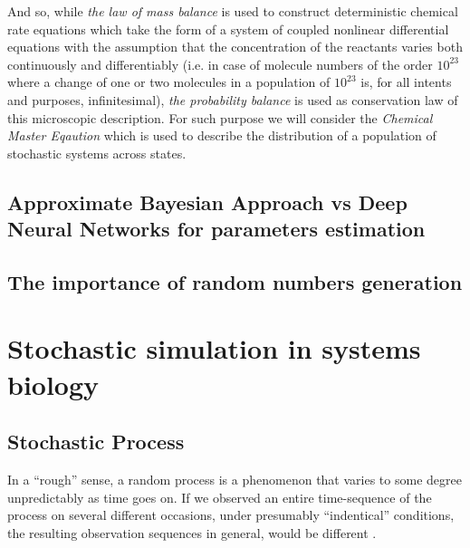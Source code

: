 \documentclass[12pt,a4paper]{report}
\begin{document}
And so, while \emph{the law of mass balance} is used to construct deterministic chemical rate equations which take the form of a system of coupled nonlinear differential equations with the assumption that the concentration of the reactants varies both continuously and differentiably (i.e. in case of molecule numbers of the order $10^{23}$ where a change of one or two molecules in a population of $10^{23}$ is, for all intents and purposes, infinitesimal), \emph{the probability balance} is used as conservation law of this microscopic description. For such purpose we will consider the \emph{Chemical Master Eqaution} which is used to describe the distribution of a population of stochastic systems across states.


\section{Approximate Bayesian Approach vs Deep Neural Networks for parameters estimation}

\section{The importance of random numbers generation}

\chapter{Stochastic simulation in systems biology}\label{Simulations}

\section{Stochastic Process}\label{stochasticprocessdefinition}
In a ``rough'' sense, a random process is a phenomenon that varies to some degree unpredictably as time goes on. If we observed an entire time-sequence of the process on several different occasions, under presumably ``indentical'' conditions, the resulting observation sequences in general, would be different \cite{AssocProfThamer}. 
\end{document}
